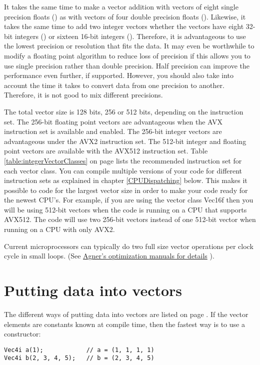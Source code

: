 \documentclass[vcl_manual.tex]{subfiles}
\begin{document}
It takes the same time to make a vector addition with vectors of eight single precision floats () as with vectors of four double precision floats (). Likewise, it takes the same time to add two integer vectors whether the vectors have eight 32-bit integers () or sixteen 16-bit integers (). Therefore, it is advantageous to use the lowest precision or resolution that fits the data. It may even be worthwhile to modify a floating point algorithm to reduce loss of precision if this allows you to use single precision rather than double precision. Half precision can improve the performance even further, if supported. 
However, you should also take into account the time it takes to convert data from one precision to another. Therefore, it is not good to mix different precisions.

The total vector size is 128 bits, 256 or 512 bits, depending on the instruction set. 
The 256-bit floating point vectors are advantageous when the AVX instruction set is available and enabled. The 256-bit integer vectors are advantageous under the AVX2 instruction set. 
The 512-bit integer and floating point vectors are available with the AVX512 instruction set.
Table \ref{table:integerVectorClasses} on page \pageref{table:integerVectorClasses} lists the recommended instruction set for each vector class. 
You can compile multiple versions of your code for different instruction sets as explained in chapter \ref{CPUDispatching} below. This makes it possible to code for the largest vector size in order to make your code ready for the newest CPU's. 
For example, if you are using the vector class Vec16f then you will be using 512-bit vectors when the code is running on a CPU that supports AVX512. The code will use two 256-bit vectors instead of one 512-bit vector when running on a CPU with only AVX2.

Current microprocessors can typically do two full size vector operations per clock cycle in small loops. (See \href{https://www.agner.org/optimize/#manuals}{Agner's optimization manuals for details} ).


\section{Putting data into vectors}\label{PuttingDataIntoVectors}

The different ways of putting data into vectors are listed on page \pageref{ConstructingVectors}. If the vector elements are constants known at compile time, then the fastest way is to use a constructor:
\begin{example}
\label{exampleVectConstructor}
\end{example}
\begin{lstlisting}[frame=single]
Vec4i a(1);            // a = (1, 1, 1, 1)
Vec4i b(2, 3, 4, 5);   // b = (2, 3, 4, 5)
\end{lstlisting}
\end{document}
